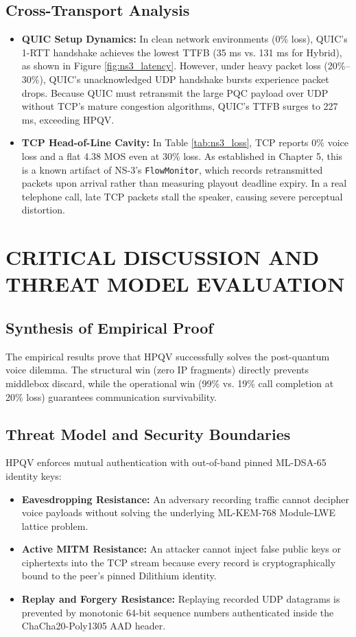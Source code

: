 \subsection{Cross-Transport Analysis}
\begin{itemize}
    \item \textbf{QUIC Setup Dynamics:} In clean network environments (0\% loss), QUIC's 1-RTT handshake achieves the lowest TTFB (35 ms vs. 131 ms for Hybrid), as shown in Figure \ref{fig:ns3_latency}. However, under heavy packet loss (20\%--30\%), QUIC's unacknowledged UDP handshake bursts experience packet drops. Because QUIC must retransmit the large PQC payload over UDP without TCP's mature congestion algorithms, QUIC's TTFB surges to 227 ms, exceeding HPQV.
    \item \textbf{TCP Head-of-Line Cavity:} In Table \ref{tab:ns3_loss}, TCP reports 0\% voice loss and a flat 4.38 MOS even at 30\% loss. As established in Chapter 5, this is a known artifact of NS-3's \texttt{FlowMonitor}, which records retransmitted packets upon arrival rather than measuring playout deadline expiry. In a real telephone call, late TCP packets stall the speaker, causing severe perceptual distortion.
\end{itemize}

\section{CRITICAL DISCUSSION AND THREAT MODEL EVALUATION}

\subsection{Synthesis of Empirical Proof}
The empirical results prove that HPQV successfully solves the post-quantum voice dilemma. The structural win (zero IP fragments) directly prevents middlebox discard, while the operational win (99\% vs. 19\% call completion at 20\% loss) guarantees communication survivability.

\subsection{Threat Model and Security Boundaries}
HPQV enforces mutual authentication with out-of-band pinned ML-DSA-65 identity keys:
\begin{itemize}
    \item \textbf{Eavesdropping Resistance:} An adversary recording traffic cannot decipher voice payloads without solving the underlying ML-KEM-768 Module-LWE lattice problem.
    \item \textbf{Active MITM Resistance:} An attacker cannot inject false public keys or ciphertexts into the TCP stream because every record is cryptographically bound to the peer's pinned Dilithium identity.
    \item \textbf{Replay and Forgery Resistance:} Replaying recorded UDP datagrams is prevented by monotonic 64-bit sequence numbers authenticated inside the ChaCha20-Poly1305 AAD header.
\end{itemize}

